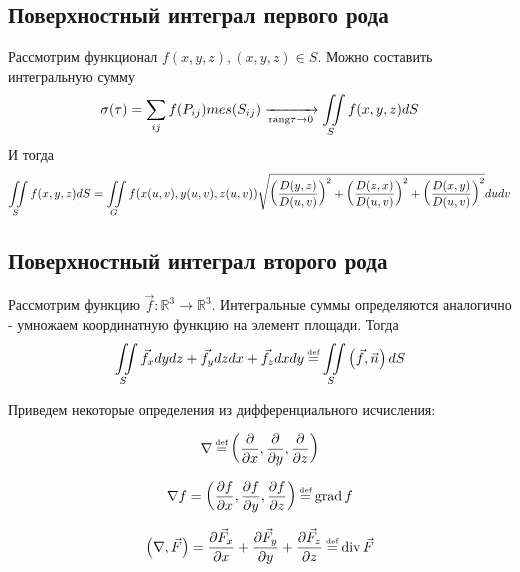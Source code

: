 \subsection{Поверхностный интеграл первого рода}

Рассмотрим функционал $f(x, y, z), (x, y, z) \in S$.
Можно составить интегральную сумму 
\begin{gather*}
	\sigma(\tau) = \sum\limits_{ij} f(P_{ij}) mes(S_{ij})
	\xrightarrow[\text{rang}\tau \rightarrow 0]{} \iint\limits_{S}f(x, y, z)dS
\end{gather*}
И тогда
\begin{gather*}
	\iint\limits_{S}f(x,y,z)dS = \iint\limits_{G}f(x(u,v), y(u,v), z(u, v))
	\sqrt{\left( \frac{D(y,z)}{D(u,v)} \right)^2 + 
	\left( \frac{D(z, x)}{D(u,v)} \right)^2 +
	\left( \frac{D(x, y)}{D(u,v)}\right)^2} dudv
\end{gather*}

\subsection{Поверхностный интеграл второго рода}

Рассмотрим функцию $\vec{f} : \mathbb{R}^3 \rightarrow \mathbb{R}^3$. Интегральные суммы определяются аналогично - умножаем координатную функцию на элемент площади. Тогда
\begin{gather*}
	\iintl{S} \vec{f}_xdydz + \vec{f}_ydzdx + \vec{f}_z dxdy \defeq 
	\iintl{S}\left( \vec{f}, \vec{n}\right)dS
\end{gather*}

Приведем некоторые определения из дифференциального исчисления:

\begin{definition}
	\begin{gather*}
		\nabla \defeq 
		\left( \pdiff{}{x}, \pdiff{}{y}, \pdiff{}{z}\right)
	\end{gather*}
\end{definition}

\begin{definition}
	\begin{gather*}
		\nabla f = \left( \pdiff{f}{x}, \pdiff{f}{y}, \pdiff{f}{z}\right)
		\defeq \grad f
	\end{gather*}
\end{definition}

\begin{definition}
	\begin{gather*}
		\left( \nabla, \vec{F}\right) = 
		\pdiff{\vec{F}_x}{x} + \pdiff{\vec{F}_y}{y} + \pdiff{\vec{F}_z}{z} \defeq \Div \vec{F}
	\end{gather*}
\end{definition}

